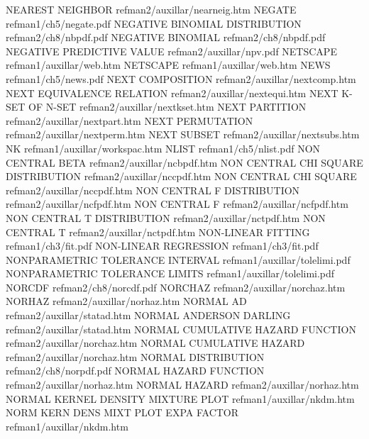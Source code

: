 NEAREST NEIGHBOR                        refman2/auxillar/nearneig.htm
NEGATE                                  refman1/ch5/negate.pdf
NEGATIVE BINOMIAL DISTRIBUTION          refman2/ch8/nbpdf.pdf
NEGATIVE BINOMIAL                       refman2/ch8/nbpdf.pdf
NEGATIVE PREDICTIVE VALUE               refman2/auxillar/npv.pdf
NETSCAPE                                refman1/auxillar/web.htm
NETSCAPE                                refman1/auxillar/web.htm
NEWS                                    refman1/ch5/news.pdf
NEXT COMPOSITION                        refman2/auxillar/nextcomp.htm
NEXT EQUIVALENCE RELATION               refman2/auxillar/nextequi.htm
NEXT K-SET OF N-SET                     refman2/auxillar/nextkset.htm
NEXT PARTITION                          refman2/auxillar/nextpart.htm
NEXT PERMUTATION                        refman2/auxillar/nextperm.htm
NEXT SUBSET                             refman2/auxillar/nextsubs.htm
NK                                      refman1/auxillar/workspac.htm
NLIST                                   refman1/ch5/nlist.pdf
NON CENTRAL BETA                        refman2/auxillar/ncbpdf.htm
NON CENTRAL CHI SQUARE DISTRIBUTION     refman2/auxillar/nccpdf.htm
NON CENTRAL CHI SQUARE                  refman2/auxillar/nccpdf.htm
NON CENTRAL F DISTRIBUTION              refman2/auxillar/ncfpdf.htm
NON CENTRAL F                           refman2/auxillar/ncfpdf.htm
NON CENTRAL T DISTRIBUTION              refman2/auxillar/nctpdf.htm
NON CENTRAL T                           refman2/auxillar/nctpdf.htm
NON-LINEAR FITTING                      refman1/ch3/fit.pdf
NON-LINEAR REGRESSION                   refman1/ch3/fit.pdf
NONPARAMETRIC TOLERANCE INTERVAL        refman1/auxillar/tolelimi.pdf
NONPARAMETRIC TOLERANCE LIMITS          refman1/auxillar/tolelimi.pdf
NORCDF                                  refman2/ch8/norcdf.pdf
NORCHAZ                                 refman2/auxillar/norchaz.htm
NORHAZ                                  refman2/auxillar/norhaz.htm
NORMAL AD                               refman2/auxillar/statad.htm
NORMAL ANDERSON DARLING                 refman2/auxillar/statad.htm
NORMAL CUMULATIVE HAZARD FUNCTION       refman2/auxillar/norchaz.htm
NORMAL CUMULATIVE HAZARD                refman2/auxillar/norchaz.htm
NORMAL DISTRIBUTION                     refman2/ch8/norpdf.pdf
NORMAL HAZARD FUNCTION                  refman2/auxillar/norhaz.htm
NORMAL HAZARD                           refman2/auxillar/norhaz.htm
NORMAL KERNEL DENSITY MIXTURE PLOT      refman1/auxillar/nkdm.htm
NORM KERN DENS MIXT PLOT EXPA FACTOR    refman1/auxillar/nkdm.htm
